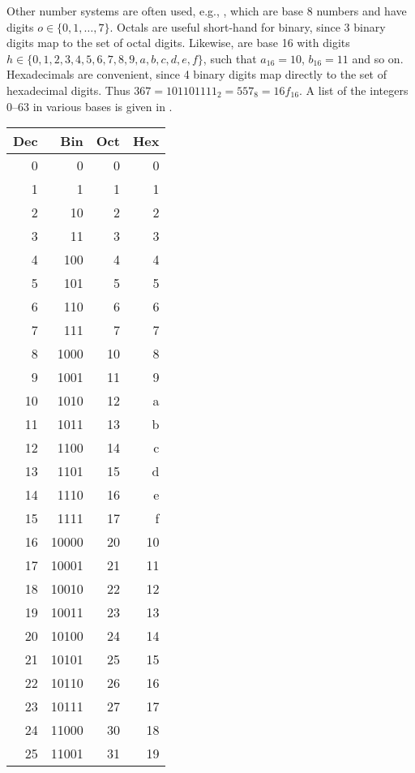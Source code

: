 \documentclass[fsharpnotes.tex]{subfiles}
\begin{document}
Other number systems are often used, e.g., , which are base 8 numbers and have digits $o\in\{0,1,\ldots,7\}$. Octals are useful short-hand for binary, since 3 binary digits map to the set of octal digits. Likewise,  are base 16 with digits $h\in\{0,1,2,3,4,5,6,7,8,9,a,b,c,d,e,f\}$, such that $a_{16}=10$, $b_{16}=11$ and so on. Hexadecimals are convenient, since 4 binary digits map directly to the set of hexadecimal digits. Thus $367 = 101101111_2 = 557_8 = 16f_{16}$. A list of the integers 0--63 in various bases is given in .
\begin{table}
  \centering
  \begin{tabular}{|r|r|r|r|}
    \hline
    \rowcolor{headerRowColor} Dec & Bin & Oct & Hex\\
    \hline
    0 & 0 & 0 & 0\\
    1 & 1 & 1 & 1\\
    2 & 10 & 2 & 2\\
    3 & 11 & 3 & 3 \\
    4 & 100 & 4 & 4\\
    5 & 101 & 5& 5\\
    6 & 110 & 6 & 6 \\
    7 & 111 & 7 & 7 \\
    8 & 1000 & 10 & 8\\
    9 & 1001 & 11 & 9\\
    10 & 1010 & 12 & a\\
    11 & 1011 & 13 & b\\
    12 & 1100 & 14 & c\\
    13 & 1101 & 15 & d\\
    14 & 1110 & 16 & e \\
    15 & 1111 & 17 & f\\
    16 & 10000 & 20 & 10\\
    17 & 10001 & 21 & 11\\
    18 & 10010 & 22 & 12\\
    19 & 10011 & 23 & 13 \\
    20 & 10100 & 24 & 14\\
    21 & 10101 & 25& 15\\
    22 & 10110 & 26 & 16 \\
    23 & 10111 & 27 & 17 \\
    24 & 11000 & 30 & 18\\
    25 & 11001 & 31 & 19\\

\end{tabular}
\end{table}
\end{document}
